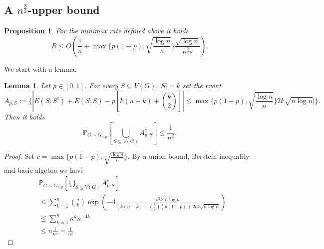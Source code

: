 \documentclass[12pt,a4paper]{article}
\numberwithin{equation}{section}
\newtheorem{lemma}[theorem]{Lemma}
\newtheorem{proposition}[theorem]{Proposition}
\numberwithin{equation}{section}
\renewcommand{\epsilon}{\varepsilon}
\newcommand{\1}{{\text{\Large $\mathfrak 1$}}}
\newcommand{\2}[1]{{\text{\Large $\mathfrak 1$}\!\left(#1\right)}}
\begin{document}
\subsection{A $n^{\frac{3}{2}}$-upper bound}

\begin{proposition}\label{thm32}
For the minimax rate defined above it holds $$R \leq O \left( \frac{1}{n}+\max\{p(1-p),\sqrt{\frac{\log n}{n}}\} \frac{\sqrt{\log n}}{n^{\frac{3}{2}} \epsilon} \right).$$
\end{proposition}

We start with a lemma.

\begin{lemma}\label{union}
Let $p \in [0,1]$. For every $S \subseteq V(G),|S|=k$ set the event $$A_{p,S}:=\{ |E(S,S^c)+E(S,S)-p\left[ k\left(n-k\right)+\binom{k}{2} \right]| \leq \max\{p(1-p),\sqrt{\frac{\log n}{n}}\}2k\sqrt{n \log n} |\}.$$ Then it holds
$$\mathbb{P}_{G \sim G_{n,p}}\left[ \bigcup_{S \subseteq V(G) } A^c_{p,S} \right] \leq \frac{1}{n^2}.$$
\end{lemma}

\begin{proof}

Set $c=\max\{p(1-p),\sqrt{\frac{\log n}{n}}\}$.
By a union bound, Berstein inequality and basic algebra we have
\begin{align*}
&\mathbb{P}_{G \sim G_{n,p}}\left[ \bigcup_{S \subseteq V(G) } A^c_{p,S} \right] \\
&\leq \sum_{k=1}^{n} \binom{n}{k} \exp\left( -4\frac{c^2k^2n \log n}{\left(k(n-k)+\binom{k}{2}\right)p(1-p)+2c k \sqrt{n \log n}} \right)\\
&\leq \sum_{k=1}^n n^k n^{-4 k} \\
&\leq n\frac{1}{n^3}=\frac{1}{n^2}
\end{align*}

\end{proof}
\end{document}
